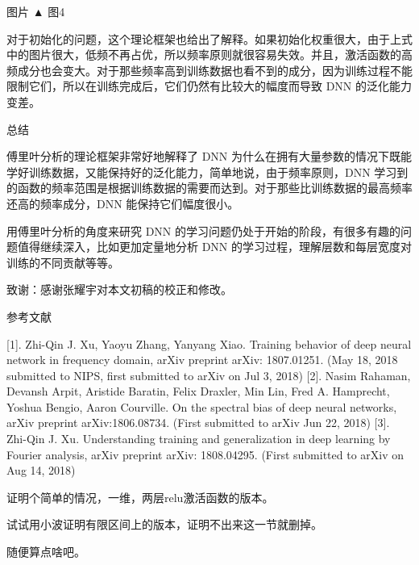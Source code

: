 图片
▲ 图4

对于初始化的问题，这个理论框架也给出了解释。如果初始化权重很大，由于上式中的图片很大，低频不再占优，所以频率原则就很容易失效。并且，激活函数的高频成分也会变大。对于那些频率高到训练数据也看不到的成分，因为训练过程不能限制它们，所以在训练完成后，它们仍然有比较大的幅度而导致 DNN 的泛化能力变差。

总结


傅里叶分析的理论框架非常好地解释了 DNN 为什么在拥有大量参数的情况下既能学好训练数据，又能保持好的泛化能力，简单地说，由于频率原则，DNN 学习到的函数的频率范围是根据训练数据的需要而达到。对于那些比训练数据的最高频率还高的频率成分，DNN 能保持它们幅度很小。

用傅里叶分析的角度来研究 DNN 的学习问题仍处于开始的阶段，有很多有趣的问题值得继续深入，比如更加定量地分析 DNN 的学习过程，理解层数和每层宽度对训练的不同贡献等等。

致谢：感谢张耀宇对本文初稿的校正和修改。

参考文献


[1]. Zhi-Qin J. Xu, Yaoyu Zhang, Yanyang Xiao. Training behavior of deep neural network in frequency domain, arXiv preprint arXiv: 1807.01251. (May 18, 2018 submitted to NIPS, first submitted to arXiv on Jul 3, 2018) 
[2]. Nasim Rahaman, Devansh Arpit, Aristide Baratin, Felix Draxler, Min Lin, Fred A. Hamprecht, Yoshua Bengio, Aaron Courville. On the spectral bias of deep neural networks, arXiv preprint arXiv:1806.08734. (First submitted to arXiv Jun 22, 2018) 
[3]. Zhi-Qin J. Xu. Understanding training and generalization in deep learning by Fourier analysis, arXiv preprint arXiv: 1808.04295. (First submitted to arXiv on Aug 14, 2018)


证明个简单的情况，一维，两层relu激活函数的版本。


试试用小波证明有限区间上的版本，证明不出来这一节就删掉。


随便算点啥吧。
